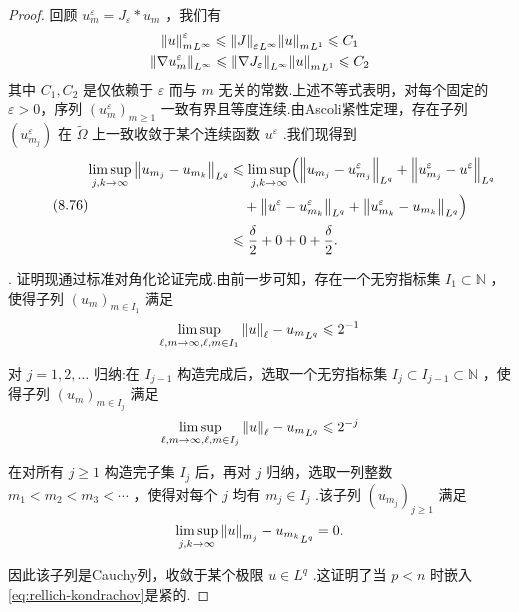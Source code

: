 \begin{proof}
回顾 ${u}_{m}^{\varepsilon } = {J}_{\varepsilon } * {u}_{m}$ ，我们有
{\begin{gather*}
    {\norm{u}_{m}^{\varepsilon }}_{{L}^{\infty }} \leqslant  {\norm{J}_{\varepsilon }}_{{L}^{\infty }}{\norm{u}_{m}}_{{L}^{1}} \leqslant  {C}_{1}\\
    \norm{\nabla {u}_{m}^{\varepsilon }}_{{L}^{\infty }} \leqslant  \norm{\nabla {J}_{\varepsilon }}_{{L}^{\infty }}{\norm{u}_{m}}_{{L}^{1}} \leqslant  {C}_{2}
\end{gather*}}
其中 ${C}_{1},{C}_{2}$ 是仅依赖于 $\varepsilon$ 而与 $m$ 无关的常数.上述不等式表明，对每个固定的 $\varepsilon  > 0$，序列 ${\left( {u}_{m}^{\varepsilon }\right) }_{m \geq  1}$ 一致有界且等度连续.由Ascoli紧性定理，存在子列 $\left( {u}_{{m}_{j}}^{\varepsilon }\right)$ 在 $\widetilde{\Omega }$ 上一致收敛于某个连续函数 ${u}^{\varepsilon }$ .我们现得到
\begin{equation}\tag{8.76}\label{eq:rellich-cauchy-estimate}
\begin{aligned}
\limsup_{{j,k \rightarrow  \infty }}\norm{{u}_{{m}_{j}} - {u}_{{m}_{k}}}_{{L}^{q}}
&\leqslant  \limsup_{{j,k \rightarrow  \infty }}\Bigl(
\norm{{u}_{{m}_{j}} - {u}_{{m}_{j}}^{\varepsilon }}_{{L}^{q}}
+ \norm{{u}_{{m}_{j}}^{\varepsilon } - {u}^{\varepsilon }}_{{L}^{q}} \\
&\quad +\norm{{u}^{\varepsilon } - {u}_{{m}_{k}}^{\varepsilon }}_{{L}^{q}}+\norm{{u}_{{m}_{k}}^{\varepsilon } - {u}_{{m}_{k}}}_{{L}^{q}}\Bigr) \\
&\leqslant  \frac{\delta }{2} + 0 + 0 + \frac{\delta }{2}.
\end{aligned}
\end{equation}

. 证明现通过标准对角化论证完成.由前一步可知，存在一个无穷指标集 ${I}_{1} \subset  \mathbb{N}$ ，使得子列 ${\left( {u}_{m}\right) }_{m \in  {I}_{1}}$ 满足
\[
\limsup_{{\ell ,m \rightarrow  \infty ,\ell ,m \in  {I}_{1}}}{\norm{u}_{\ell } - {u}_{m}}_{{L}^{q}} \leqslant  {2}^{-1}
\]

对 $j = 1,2,\ldots$ 归纳:在 ${I}_{j - 1}$ 构造完成后，选取一个无穷指标集 ${I}_{j} \subset  {I}_{j - 1} \subset  \mathbb{N}$ ，使得子列 ${\left( {u}_{m}\right) }_{m \in  {I}_{j}}$ 满足
\[
\limsup_{{\ell ,m \rightarrow  \infty ,\ell ,m \in  {I}_{j}}}{\norm{u}_{\ell } - {u}_{m}}_{{L}^{q}} \leqslant  {2}^{-j}
\]

在对所有 $j \geq  1$ 构造完子集 ${I}_{j}$ 后，再对 $j$ 归纳，选取一列整数 ${m}_{1} < {m}_{2} < {m}_{3} < \cdots$ ，使得对每个 $j$ 均有 ${m}_{j} \in  {I}_{j}$ .该子列 ${\left( {u}_{{m}_{j}}\right) }_{j \geq  1}$ 满足
\[
\limsup_{{j,k \rightarrow  \infty }}{\norm{u}_{{m}_{j}} - {u}_{{m}_{k}}}_{{L}^{q}} = 0.
\]

因此该子列是Cauchy列，收敛于某个极限 $u \in  {L}^{q}$ .这证明了当 $p < n$ 时嵌入\eqref{eq:rellich-kondrachov}是紧的.
\end{proof}

